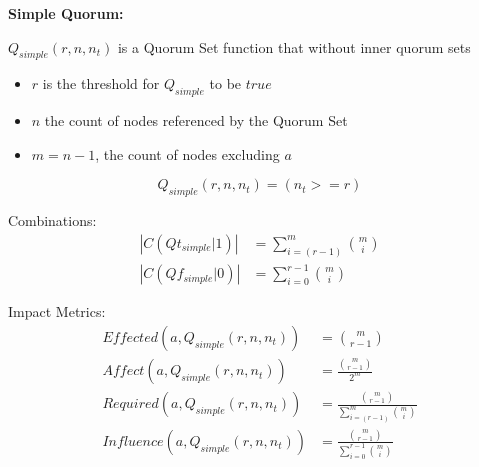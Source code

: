 \documentclass[10pt]{article}
\begin{document}
\newcommand{\powerset}[1]{\mathbb{P}(#1)}
\newcommand{\cardinality}[1]{\left\vert{#1}\right\vert}

\newcommand{\tgt}[0]{ \cardinality{ C(Qt|1) } }
\newcommand{\tgf}[0]{ \cardinality{ C(Qt|0) } }
\newcommand{\fgt}[0]{ \cardinality{ C(Qf|1) } }
\newcommand{\fgf}[0]{ \cardinality{ C(Qf|0) } }
\newcommand{\effected}[0]{ \tgt + \fgf - 2^m }

\setcounter{equation}{8}

\newcommand{\simpleCombinations}[0]{ \binom{m}{r-1} }




\textbf{Simple Quorum:}\\\par
$Q_{simple}(r,n,n_t)$ is a Quorum Set function that without inner quorum sets
\begin{itemize}
  \item $r$ is the threshold for $Q_{simple}$ to be $true$
  \item $n$ the count of nodes referenced by the Quorum Set
  \item $m = n-1$, the count of nodes excluding $a$
\end{itemize}

\begin{equation}
  Q_{simple}(r,n,n_t) = (n_t>=r)
\end{equation}

Combinations:
\begin{align}
  \cardinality{ C(Qt_{simple}|1) } &= \sum_{i=(r-1)}^m \binom{m}{i} \\
  \cardinality{ C(Qf_{simple}|0) } &= \sum_{i=0}^{r-1} \binom{m}{i}
\end{align}

Impact Metrics:
\begin{align}
  Effected(a,Q_{simple}(r,n,n_t)) &= \simpleCombinations \\
  Affect(a,Q_{simple}(r,n,n_t)) &= \frac{ \simpleCombinations{} }{ 2^m } \\
  Required(a,Q_{simple}(r,n,n_t)) &= \frac{ \simpleCombinations{} }{ \sum_{i=(r-1)}^{m} \binom{m}{i} } \\
  Influence(a,Q_{simple}(r,n,n_t)) &= \frac{ \simpleCombinations{} }{ \sum_{i=0}^{r-1} \binom{m}{i} }
\end{align}
\end{document}
